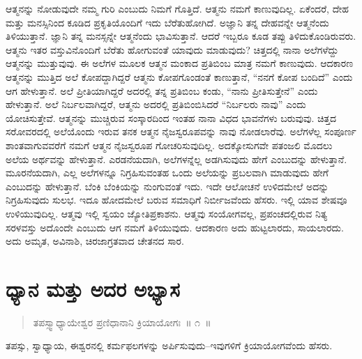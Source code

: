 ಆತ್ಮನನ್ನು ನೋಡುವುದೇ ನಮ್ಮ ಗುರಿ ಎಂಬುದು ನಿಮಗೆ ಗೊತ್ತಿದೆ. ಆತ್ಮನು ನಮಗೆ ಕಾಣುವುದಿಲ್ಲ. ಏಕೆಂದರೆ, ದೇಹ ಮತ್ತು ಮನಸ್ಸಿನಿಂದ ಕೂಡಿದ ಪ್ರಕೃತಿಯೊಂದಿಗೆ ಇದು ಬೆರೆತುಹೋಗಿದೆ. ಅಜ್ಞಾನಿ ತನ್ನ ದೇಹವನ್ನೇ ಆತ್ಮನೆಂದು ತಿಳಿಯುತ್ತಾನೆ. ಜ್ಞಾನಿ ತನ್ನ ಮನಸ್ಸನ್ನೇ ಆತ್ಮನೆಂದು ಭಾವಿಸುತ್ತಾನೆ. ಆದರೆ ಇಬ್ಬರೂ ಕೂಡ ತಪ್ಪು ತಿಳಿದುಕೊಂಡಿರುವರು. ಆತ್ಮನು ಇತರ ವಸ್ತುವಿನೊಂದಿಗೆ ಬೆರೆತು ಹೋಗುವಂತೆ ಯಾವುದು ಮಾಡುವುದು? ಚಿತ್ತದಲ್ಲಿ ನಾನಾ ಅಲೆಗಳೆದ್ದು ಆತ್ಮನನ್ನು ಮುತ್ತುವುವು. ಈ ಅಲೆಗಳ ಮೂಲಕ ಆತ್ಮನ ಮಂಕಾದ ಪ್ರತಿಬಿಂಬ ಮಾತ್ರ ನಮಗೆ ಕಾಣುವುದು. ಆದಕಾರಣ ಆತ್ಮನನ್ನು ಮುತ್ತಿದ ಅಲೆ ಕೋಪದ್ದಾಗಿದ್ದರೆ ಆತ್ಮನು ಕೋಪಗೊಂಡಂತೆ ಕಾಣುತ್ತಾನೆ, “ನನಗೆ ಕೋಪ ಬಂದಿದೆ” ಎಂದು ಆಗ ಹೇಳುತ್ತಾನೆ. ಅಲೆ ಪ್ರೀತಿಯಾಗಿದ್ದರೆ ಅದರಲ್ಲಿ ತನ್ನ ಪ್ರತಿಬಿಂಬ ಕಂಡು, “ನಾನು ಪ್ರೀತಿಸುತ್ತೇನೆ” ಎಂದು ಹೇಳುತ್ತಾನೆ. ಅಲೆ ನಿರ್ಬಲವಾಗಿದ್ದರೆ, ಆತ್ಮನು ಅದರಲ್ಲಿ ಪ್ರತಿಬಿಂಬಿಸಿದರೆ “ನಿರ್ಬಲರು ನಾವು” ಎಂದು ಯೋಚಿಸುತ್ತೇವೆ. ಆತ್ಮನನ್ನು ಮುಚ್ಚಿರುವ ಸಂಸ್ಕಾರದಿಂದ ಇಂತಹ ನಾನಾ ವಿಧದ ಭಾವನೆಗಳು ಬರುವುವು. ಚಿತ್ತದ ಸರೋವರದಲ್ಲಿ ಅಲೆಯೊಂದು ಇರುವ ತನಕ ಆತ್ಮನ ನೈಜಸ್ವರೂಪವನ್ನು ನಾವು ನೋಡಲಾರೆವು. ಅಲೆಗಳೆಲ್ಲ ಸಂಪೂರ್ಣ ಶಾಂತವಾಗುವವರೆಗೆ ನಮಗೆ ಆತ್ಮನ ನೈಜಸ್ವರೂಪ ಗೋಚರಿಸುವುದಿಲ್ಲ. ಅದಕ್ಕೋಸುಗವೇ ಪತಂಜಲಿ ಮೊದಲು ಅಲೆಯ ಅರ್ಥವನ್ನು ಹೇಳುತ್ತಾನೆ. ಎರಡನೆಯದಾಗಿ, ಅಲೆಗಳನ್ನೆಲ್ಲ ಅಡಗಿಸುವುದು ಹೇಗೆ ಎಂಬುದನ್ನು ಹೇಳುತ್ತಾನೆ. ಮೂರನೆಯದಾಗಿ, ಎಲ್ಲ ಅಲೆಗಳನ್ನೂ ನಿಗ್ರಹಿಸುವಂತಹ ಒಂದು ಅಲೆಯನ್ನು ಪ್ರಬಲವಾಗಿ ಮಾಡುವುದು ಹೇಗೆ ಎಂಬುದನ್ನು ಹೇಳುತ್ತಾನೆ. ಬೆಂಕಿ ಬೆಂಕಿಯನ್ನು ನುಂಗುವಂತೆ ಇದು. ಇದೇ ಆಲೋಚನೆ ಉಳಿದಮೇಲೆ ಅದನ್ನು ನಿಗ್ರಹಿಸುವುದು ಸುಲಭ. ಇದೂ ಹೋದಮೇಲೆ ಬರುವ ಸಮಾಧಿಗೆ ನಿರ್ಬೀಜವೆಂದು ಹೆಸರು. ಇಲ್ಲಿ ಯಾವ ಶೇಷವೂ ಉಳಿಯುವುದಿಲ್ಲ. ಆತ್ಮವು ಇಲ್ಲಿ ಸ್ವಯಂ ಜ್ಯೋತಿಪ್ರಕಾಶನು. ಆತ್ಮವು ಸಂಯೋಗವಲ್ಲ, ಪ್ರಪಂಚದಲ್ಲಿರುವ ನಿತ್ಯ ಸರಳವಸ್ತು ಅದೊಂದೇ ಎಂಬುದು ಆಗ ನಮಗೆ ತಿಳಿಯುವುದು. ಆದಕಾರಣ ಅದು ಹುಟ್ಟಲಾರದು, ಸಾಯಲಾರದು. ಅದು ಅಮೃತ, ಅವಿನಾಶಿ, ಚಿರಜಾಗ್ರತವಾದ ಚೇತನದ ಸಾರ.

\chapter{ಧ್ಯಾನ ಮತ್ತು ಅದರ ಅಭ್ಯಾಸ}%

\begin{verse}
ತಪಸ್ಸ್ವಾಧ್ಯಾಯೇಶ್ವರ ಪ್ರಣಿಧಾನಾನಿ ಕ್ರಿಯಾಯೋಗಃ~॥ ೧~॥
\end{verse}

\vspace{-0.3cm}

ತಪಸ್ಸು, ಸ್ವಾಧ್ಯಾಯ, ಈಶ್ವರನಲ್ಲಿ ಕರ್ಮಫಲಗಳನ್ನು ಅರ್ಪಿಸುವುದು–ಇವುಗಳಿಗೆ ಕ್ರಿಯಾಯೋಗವೆಂದು ಹೆಸರು. 

